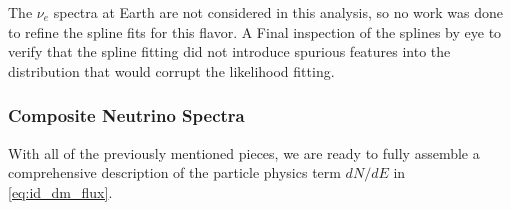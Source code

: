 The $\nu_e$ spectra at Earth are not considered in this analysis, so no work was done to refine the spline fits for this flavor.
A Final inspection of the splines by eye to verify that the spline fitting did not introduce spurious features into the distribution that would corrupt the likelihood fitting.

\subsubsection{Composite Neutrino Spectra}\label{sec:icDM_composite_dNdE}

With all of the previously mentioned pieces, we are ready to fully assemble a comprehensive description of the particle physics term $dN/dE$ in \cref{eq:id_dm_flux}.
\nuIDDMFlux

